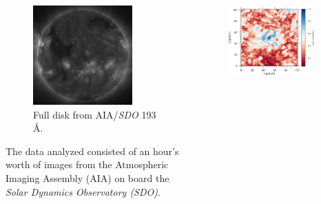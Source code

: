 \documentclass[t]{beamer}
\begin{document}
\begin{frame}[t]{}{}
\begin{tcolorbox}[colback=mygray!5,colframe=mygray!40!mygray,
        title=Coronal Seismology: Application to Bright Points in a Coronal Hole]
\begin{columns}
\begin{tcolorbox}[colback=mygray!5,colframe=mygray!40!mygray,
            title=Data]
\begin{figure}
                \includegraphics[width=0.8\textwidth]{full_disk.png}
                \caption{Full disk from AIA/\emph{SDO} 193 \AA{}.}
            \end{figure}
            The data analyzed consisted of an hour's worth of images from the
            Atmospheric Imaging Assembly (AIA) on board the \emph{Solar Dynamics
            Observatory (SDO)}.
        \end{tcolorbox}
        \par\vspace{1in}
        \begin{tcolorbox}[colback=mygray!5,colframe=mygray!40!mygray,title=Results]
            \begin{figure}
                \includegraphics[width=0.9\textwidth]{cc_color_2.png}

\end{figure}
\end{tcolorbox}
\end{columns}
\end{tcolorbox}
\end{frame}
\end{document}

